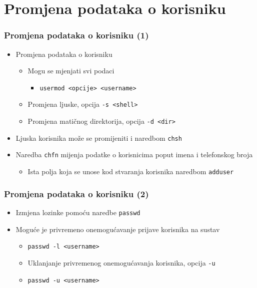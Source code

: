 \documentclass[table,usenames,dvipsnames] {beamer}
\newcommand{\shell}[1]{\texttt{#1}}
\begin{document}
\section{Promjena podataka o korisniku}
\begin{frame}[t]
\frametitle{Promjena podataka o korisniku (1)}
\begin{itemize}
  \item Promjena podataka o korisniku
  \begin{itemize}
    \item Mogu se mjenjati svi podaci
    \begin{itemize}
      \item[] \shell{usermod <opcije> <username>}
    \end{itemize}
    \item Promjena ljuske, opcija \shell{-s <shell>}
    \item Promjena matičnog direktorija, opcija \shell{-d <dir>}
  \end{itemize}
  \item Ljuska korisnika može se promijeniti i  naredbom \shell{chsh}
  \item Naredba \shell{chfn} mijenja podatke o korisnicima poput imena 
        i telefonskog broja
  \begin{itemize}
    \item Ista polja koja se unose kod stvaranja korisnika naredbom 
          \shell{adduser}
  \end{itemize}
\end{itemize}
\end{frame}

\begin{frame}[t]
\frametitle{Promjena podataka o korisniku (2)}
\begin{itemize}
  \item Izmjena lozinke pomoću naredbe \shell{passwd}
  \item Moguće je privremeno onemogućavanje prijave korisnika na sustav
  \begin{itemize}
    \item[] \shell{passwd -l <username>}
    \item Uklanjanje privremenog onemogućavanja korisnika, opcija 
          \shell{-u}
    \item[] \shell{passwd -u <username>} 
  \end{itemize}
\end{itemize}
\end{frame}
\end{document}
